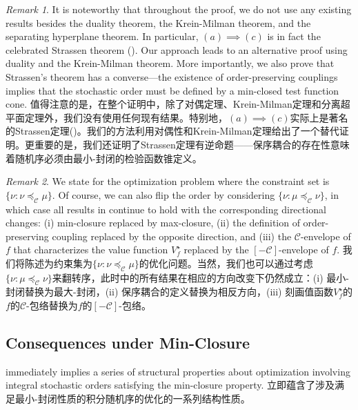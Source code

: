 \documentclass[12pt,letterpaper]{article}
\newenvironment{original}{\color{black}}{}
\newenvironment{translation}{\color{blue}}{}
\theoremstyle{plain}
\theoremstyle{definition}
\theoremstyle{remark}
\newtheorem{rmk}{Remark}
\newcommand{\C}{\mathcal{C}}
\theoremstyle{definition}
\begin{document}
\begin{rmk}
\begin{original}
It is noteworthy that throughout the proof, we do not use any existing results besides the duality theorem, the Krein-Milman theorem, and the separating hyperplane theorem. In particular, $(a) \implies (c)$ is in fact the celebrated Strassen theorem (\citealt{Strassen1965,meyer1966}). Our approach leads to an alternative proof using duality and the Krein-Milman theorem. More importantly, we also prove that Strassen's theorem has a converse---the existence of order-preserving couplings implies that the stochastic order must be defined by a min-closed test function cone.
\end{original}
\begin{translation}
值得注意的是，在整个证明中，除了对偶定理、Krein-Milman定理和分离超平面定理外，我们没有使用任何现有结果。特别地，$(a) \implies (c)$实际上是著名的Strassen定理(\citealt{Strassen1965,meyer1966})。我们的方法利用对偶性和Krein-Milman定理给出了一个替代证明。更重要的是，我们还证明了Strassen定理有逆命题——保序耦合的存在性意味着随机序必须由最小-封闭的检验函数锥定义。
\end{translation}
\end{rmk}
\begin{rmk}
\begin{original}
 We state  for the optimization problem where the constraint set is $\{\nu: \nu \preceq_\C \mu\}$. Of course, we can also flip the order by considering $\{\nu: \mu \preceq_\C \nu\}$, in which case all results in  continue to hold with the corresponding directional changes: (i) min-closure replaced by max-closure, (ii) the definition of order-preserving coupling replaced by the opposite direction, and (iii) the $\C$-envelope of $f$ that characterizes the value function $V^\star_f$ replaced by the $[-\C]$-envelope of $f$.
\end{original}
\begin{translation}
我们将陈述为约束集为$\{\nu: \nu \preceq_\C \mu\}$的优化问题。当然，我们也可以通过考虑$\{\nu: \mu \preceq_\C \nu\}$来翻转序，此时中的所有结果在相应的方向改变下仍然成立：(i) 最小-封闭替换为最大-封闭，(ii) 保序耦合的定义替换为相反方向，(iii) 刻画值函数$V^\star_f$的$f$的$\C$-包络替换为$f$的$[-\C]$-包络。
\end{translation}
\end{rmk}

\subsection{Consequences under Min-Closure}
\begin{original}
 immediately implies a series of structural properties about optimization involving integral stochastic orders satisfying the min-closure property.
\end{original}
\begin{translation}
立即蕴含了涉及满足最小-封闭性质的积分随机序的优化的一系列结构性质。
\end{translation}
\end{document}
